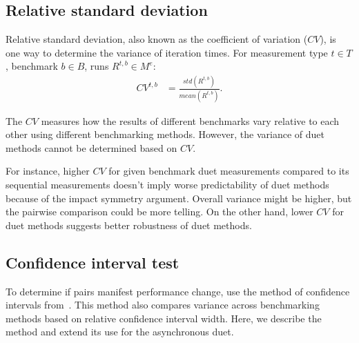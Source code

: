 \subsection{Relative standard deviation}
\label{sec:cv}

Relative standard deviation, also known as the coefficient of variation ($CV$), is one way to determine the variance of iteration times.
For measurement type $t \in T$, benchmark $b \in B$, runs $R^{t, b} \in M^e$:
\begin{align*}
CV^{t, b} &= \frac{std(R^{t, b})}{mean(R^{t, b})}.
\end{align*}

The $CV$ measures how the results of different benchmarks vary relative to each other using different benchmarking methods.
However, the variance of duet methods cannot be determined based on $CV$.

For instance, higher $CV$ for given benchmark duet measurements compared to its sequential measurements doesn't imply worse predictability of duet methods because of the impact symmetry argument.
Overall variance might be higher, but the pairwise comparison could be more telling.
On the other hand, lower $CV$ for duet methods suggests better robustness of duet methods.

\subsection{Confidence interval test}
\label{sec:ci_test}

To determine if pairs manifest performance change, use the method of confidence intervals from~\citet{bulej2020duet}.
This method also compares variance across benchmarking methods based on relative confidence interval width.
Here, we describe the method and extend its use for the asynchronous duet.

